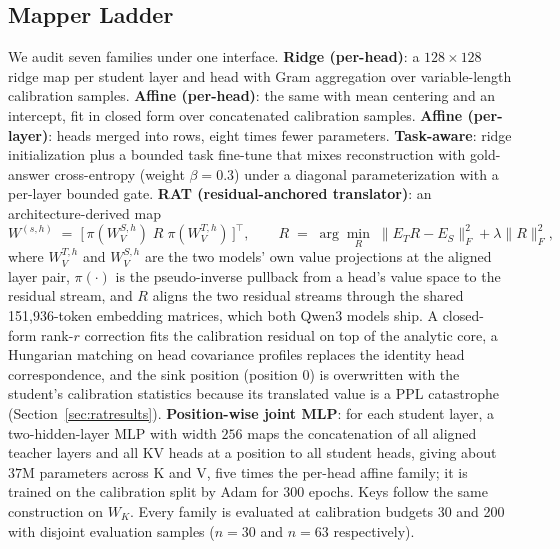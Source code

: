 \documentclass[10pt]{article}
\begin{document}
\subsection{Mapper Ladder}
We audit seven families under one interface. \textbf{Ridge (per-head)}: a
$128\times128$ ridge map per student layer and head with Gram aggregation
over variable-length calibration samples. \textbf{Affine (per-head)}: the
same with mean centering and an intercept, fit in closed form over
concatenated calibration samples. \textbf{Affine (per-layer)}: heads merged
into rows, eight times fewer parameters. \textbf{Task-aware}: ridge
initialization plus a bounded task fine-tune that mixes reconstruction with
gold-answer cross-entropy (weight $\beta{=}0.3$) under a diagonal
parameterization with a per-layer bounded gate. \textbf{RAT
(residual-anchored translator)}: an architecture-derived map
\begin{equation}
W^{(s,h)} \;=\; \bigl[\,\pi(W^{S,h}_V)\;R\;\pi(W^{T,h}_V)\,\bigr]^{\!\top},
\qquad
R \;=\; \arg\min_R \; \|E_T R - E_S\|_F^2 + \lambda \|R\|_F^2,
\end{equation}
where $W^{T,h}_V$ and $W^{S,h}_V$ are the two models' own value projections
at the aligned layer pair, $\pi(\cdot)$ is the pseudo-inverse pullback from a
head's value space to the residual stream, and $R$ aligns the two residual
streams through the shared 151{,}936-token embedding matrices, which both
Qwen3 models ship. A closed-form rank-$r$ correction fits the calibration
residual on top of the analytic core, a Hungarian matching on head covariance
profiles replaces the identity head correspondence, and the sink position
(position 0) is overwritten with the student's calibration statistics because
its translated value is a PPL catastrophe (Section~\ref{sec:ratresults}).
\textbf{Position-wise joint MLP}: for each student layer, a
two-hidden-layer MLP with width $256$ maps the concatenation of all aligned
teacher layers and all KV heads at a position to all student heads, giving
about $37$M parameters across K and V, five times the per-head affine family;
it is trained on the calibration split by Adam for $300$ epochs.
Keys follow the same construction on $W_K$. Every family is evaluated at
calibration budgets 30 and 200 with disjoint evaluation samples
($n{=}30$ and $n{=}63$ respectively).
\end{document}
